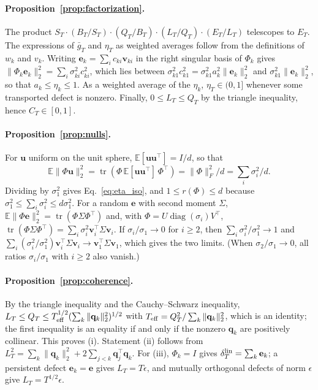 \paragraph{Proposition~\ref{prop:factorization}.} The product $S_T\cdot(B_T/S_T)\cdot(Q_T/B_T)\cdot(L_T/Q_T)\cdot(E_T/L_T)$ telescopes to $E_T$. The expressions of $\bar g_T$ and $\eta_T$ as weighted averages follow from the definitions of $w_k$ and $v_k$. Writing $\mathbf e_k=\sum_ic_{ki}\mathbf v_{ki}$ in the right singular basis of $\Phi_k$ gives $\|\Phi_k\mathbf e_k\|_2^2=\sum_i\sigma_{ki}^2c_{ki}^2$, which lies between $\sigma_{k1}^2c_{k1}^2=\sigma_{k1}^2a_k^2\|\mathbf e_k\|_2^2$ and $\sigma_{k1}^2\|\mathbf e_k\|_2^2$, so that $a_k\le\eta_k\le1$. As a weighted average of the $\eta_k$, $\eta_T\in(0,1]$ whenever some transported defect is nonzero. Finally, $0\le L_T\le Q_T$ by the triangle inequality, hence $C_T\in[0,1]$.

\paragraph{Proposition~\ref{prop:nulls}.} For $\mathbf u$ uniform on the unit sphere, $\mathbb E[\mathbf u\mathbf u^\top]=I/d$, so that\[\mathbb E\|\Phi\mathbf u\|_2^2=\operatorname{tr}(\Phi\,\mathbb E[\mathbf u\mathbf u^\top]\,\Phi^\top)=\|\Phi\|_F^2/d=\sum_i\sigma_i^2/d.\] Dividing by $\sigma_1^2$ gives Eq.~\eqref{eq:eta_iso}, and $1\le r(\Phi)\le d$ because $\sigma_1^2\le\sum_i\sigma_i^2\le d\sigma_1^2$. For a random $\mathbf e$ with second moment $\Sigma$, $\mathbb E\|\Phi\mathbf e\|_2^2=\operatorname{tr}(\Phi\Sigma\Phi^\top)$ and, with $\Phi=U\operatorname{diag}(\sigma_i)V^\top$, $\operatorname{tr}(\Phi\Sigma\Phi^\top)=\sum_i\sigma_i^2\mathbf v_i^\top\Sigma\mathbf v_i$. If $\sigma_i/\sigma_1\to0$ for $i\ge2$, then $\sum_i\sigma_i^2/\sigma_1^2\to1$ and $\sum_i(\sigma_i^2/\sigma_1^2)\mathbf v_i^\top\Sigma\mathbf v_i\to\mathbf v_1^\top\Sigma\mathbf v_1$, which gives the two limits. (When $\sigma_2/\sigma_1\to0$, all ratios $\sigma_i/\sigma_1$ with $i\ge2$ also vanish.)

\paragraph{Proposition~\ref{prop:coherence}.} By the triangle inequality and the Cauchy--Schwarz inequality, $L_T\le Q_T\le T_{\rm eff}^{1/2}(\sum_k\|\mathbf q_k\|_2^2)^{1/2}$ with $T_{\rm eff}=Q_T^2/\sum_k\|\mathbf q_k\|_2^2$, which is an identity; the first inequality is an equality if and only if the nonzero $\mathbf q_k$ are positively collinear. This proves (i). Statement (ii) follows from $L_T^2=\sum_k\|\mathbf q_k\|_2^2+2\sum_{j<k}\mathbf q_j^\top\mathbf q_k$. For (iii), $\Phi_k=I$ gives $\delta^{\rm lin}_T=\sum_k\mathbf e_k$; a persistent defect $\mathbf e_k=\mathbf e$ gives $L_T=T\epsilon$, and mutually orthogonal defects of norm $\epsilon$ give $L_T=T^{1/2}\epsilon$.

